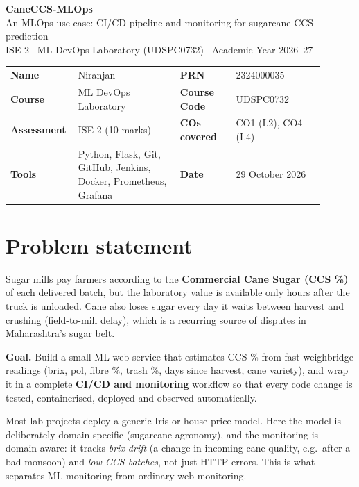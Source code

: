 \documentclass[10pt,a4paper]{article}
\let\oldsection\section
\renewcommand{\section}{\Needspace{14\baselineskip}\oldsection}
\begin{document}
\begin{tcolorbox}[colback=cane,colframe=cane,coltext=white,arc=3pt,left=10pt,right=10pt,top=8pt,bottom=8pt]
{\Large\bfseries CaneCCS-MLOps}\\[2pt]
{\large An MLOps use case: CI/CD pipeline and monitoring for sugarcane CCS prediction}\\[6pt]
\small ISE-2 \textbullet\ ML DevOps Laboratory (UDSPC0732) \textbullet\ Academic Year 2026--27
\end{tcolorbox}

\vspace{4pt}
\begin{tabular}{@{}p{0.15\linewidth}p{0.31\linewidth}p{0.17\linewidth}p{0.27\linewidth}@{}}
\textbf{Name} & Niranjan & \textbf{PRN} & 2324000035\\
\textbf{Course} & ML DevOps Laboratory & \textbf{Course Code} & UDSPC0732\\
\textbf{Assessment} & ISE-2 (10 marks) & \textbf{COs covered} & CO1 (L2), CO4 (L4)\\
\textbf{Tools} & Python, Flask, Git, GitHub, Jenkins, Docker, Prometheus, Grafana & \textbf{Date} & 29 October 2026\\
\end{tabular}

\section{Problem statement}
Sugar mills pay farmers according to the \textbf{Commercial Cane Sugar (CCS \%)} of each delivered batch, but the
laboratory value is available only hours after the truck is unloaded. Cane also loses sugar every day it waits between
harvest and crushing (field-to-mill delay), which is a recurring source of disputes in Maharashtra's sugar belt.

\textbf{Goal.} Build a small ML web service that estimates CCS \% from fast weighbridge readings (brix, pol, fibre \%,
trash \%, days since harvest, cane variety), and wrap it in a complete \textbf{CI/CD and monitoring} workflow so that every
code change is tested, containerised, deployed and observed automatically.

\begin{note}
Most lab projects deploy a generic Iris or house-price model. Here the model is deliberately domain-specific
(sugarcane agronomy), and the monitoring is domain-aware: it tracks \emph{brix drift} (a change in incoming cane quality, e.g.\ after
a bad monsoon) and \emph{low-CCS batches}, not just HTTP errors. This is what separates ML monitoring from ordinary
web monitoring.
\end{note}
\end{document}
